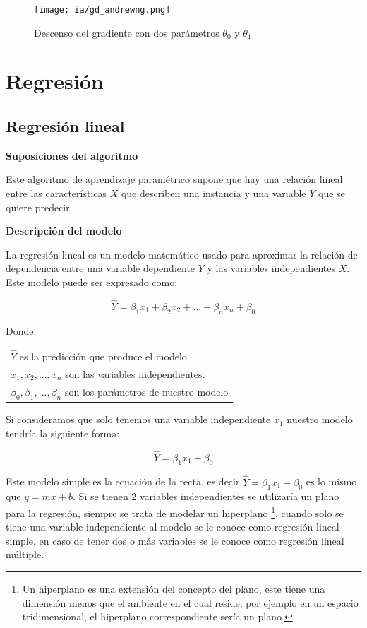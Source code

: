 \documentclass[11pt,fleqn]{book} %
\begin{document}
\begin{figure}[ht]
\centering\texttt{[image: ia/gd\_andrewng.png]}
\caption{Descenso del gradiente con dos parámetros $\theta_0$ y $\theta_1$}

\label{fig:cost_function_der_two_params} 
\end{figure}


\section{Regresión} 

\subsection{Regresión lineal} 
\textbf{Suposiciones del algoritmo}

Este algoritmo de aprendizaje paramétrico supone que hay una relación lineal entre las características $X$ que describen una instancia y una variable $Y$ que se quiere predecir.

\textbf{Descripción del modelo}

La regresión lineal es un modelo matemático usado para aproximar la relación de dependencia entre una variable dependiente $Y$ y las variables independientes $X$. Este modelo puede ser expresado como:

\begin{equation}
\label{eqn:linear_regression}
\hat{Y}  = \beta _1 x_1 + \beta _2 x_2 + ... + \beta _n x_n + \beta _0
\end{equation}

Donde: 

\begin{tabular}{l}
	$\hat{Y}$ es la predicción que produce el modelo.\\
$x_1,x_2,...,x_n$ son las variables independientes.\\
$\beta _0,\beta _1,...,\beta _n$ son los parámetros de nuestro modelo\\
\end{tabular}

Si consideramos que solo tenemos una variable independiente $x_1$ nuestro modelo tendría la siguiente forma:

\begin{equation}
\hat{Y}  = \beta _1 x_1 + \beta _0
\end{equation}

Este modelo simple es la ecuación de la recta, es decir $\hat{Y}  = \beta _1 x_1 + \beta _0$ es lo mismo que $y = mx + b$. Si se tienen 2 variables independientes se utilizaría un plano para la regresión, siempre se trata de modelar un hiperplano \footnote{Un hiperplano es una extensión del concepto del plano, este tiene una dimensión menos que el ambiente en el cual reside, por ejemplo en un espacio tridimensional, el hiperplano correspondiente sería un plano.}, cuando solo se tiene una variable independiente al modelo se le conoce como regresión lineal simple, en caso de tener dos o más variables se le conoce como regresión lineal múltiple.
\end{document}
